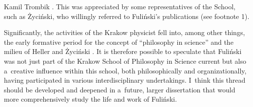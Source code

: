 \begin{artengenv}{Kamil Trombik}
{%
\parencite[][p.147]{fulinski_glos_1995}.%
} This was appreciated by some representatives of the School, such as Życiński, who willingly referred to Fuliński's publications (see footnote 1).



Significantly, the activities of the Krakow physicist fell into, among other things, the early formative period for the concept of ``philosophy in science'' and the milieu of Heller and Życiński 
\parencite[][]{trombik_koncepcje_2021}. %
 It is therefore possible to speculate that Fuliński was not just part of the Krakow School of Philosophy in Science current but also a~creative influence within this school, both philosophically and organizationally, having participated in various interdisciplinary undertakings. I~think this thread should be developed and deepened in a~future, larger dissertation that would more comprehensively study the life and work of Fuliński.




\end{artengenv}
